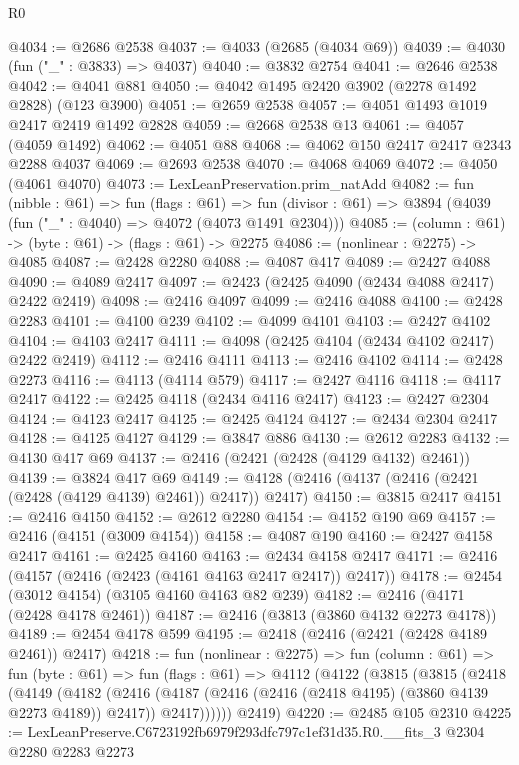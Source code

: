 \begin{lexlean}{R0}
\begin{coremodule}
@4034 := @2686 @2538
@4037 := @4033 (@2685 (@4034 @69))
@4039 := @4030 (fun ("_" : @3833) => @4037)
@4040 := @3832 @2754
@4041 := @2646 @2538
@4042 := @4041 @881
@4050 := @4042 @1495 @2420 @3902 (@2278 @1492 @2828) (@123 @3900)
@4051 := @2659 @2538
@4057 := @4051 @1493 @1019 @2417 @2419 @1492 @2828
@4059 := @2668 @2538 @13
@4061 := @4057 (@4059 @1492)
@4062 := @4051 @88
@4068 := @4062 @150 @2417 @2417 @2343 @2288 @4037
@4069 := @2693 @2538
@4070 := @4068 @4069
@4072 := @4050 (@4061 @4070)
@4073 := LexLeanPreservation.prim_natAdd
@4082 := fun (nibble : @61) =>
  fun (flags : @61) =>
  fun (divisor : @61) => @3894 (@4039 (fun ("_" : @4040) => @4072 (@4073 @1491 @2304)))
@4085 := (column : @61) -> (byte : @61) -> (flags : @61) -> @2275
@4086 := (nonlinear : @2275) -> @4085
@4087 := @2428 @2280
@4088 := @4087 @417
@4089 := @2427 @4088
@4090 := @4089 @2417
@4097 := @2423 (@2425 @4090 (@2434 @4088 @2417) @2422 @2419)
@4098 := @2416 @4097
@4099 := @2416 @4088
@4100 := @2428 @2283
@4101 := @4100 @239
@4102 := @4099 @4101
@4103 := @2427 @4102
@4104 := @4103 @2417
@4111 := @4098 (@2425 @4104 (@2434 @4102 @2417) @2422 @2419)
@4112 := @2416 @4111
@4113 := @2416 @4102
@4114 := @2428 @2273
@4116 := @4113 (@4114 @579)
@4117 := @2427 @4116
@4118 := @4117 @2417
@4122 := @2425 @4118 (@2434 @4116 @2417)
@4123 := @2427 @2304
@4124 := @4123 @2417
@4125 := @2425 @4124
@4127 := @2434 @2304 @2417
@4128 := @4125 @4127
@4129 := @3847 @886
@4130 := @2612 @2283
@4132 := @4130 @417 @69
@4137 := @2416 (@2421 (@2428 (@4129 @4132) @2461))
@4139 := @3824 @417 @69
@4149 := @4128 (@2416 (@4137 (@2416 (@2421 (@2428 (@4129 @4139) @2461)) @2417)) @2417)
@4150 := @3815 @2417
@4151 := @2416 @4150
@4152 := @2612 @2280
@4154 := @4152 @190 @69
@4157 := @2416 (@4151 (@3009 @4154))
@4158 := @4087 @190
@4160 := @2427 @4158 @2417
@4161 := @2425 @4160
@4163 := @2434 @4158 @2417
@4171 := @2416 (@4157 (@2416 (@2423 (@4161 @4163 @2417 @2417)) @2417))
@4178 := @2454 (@3012 @4154) (@3105 @4160 @4163 @82 @239)
@4182 := @2416 (@4171 (@2428 @4178 @2461))
@4187 := @2416 (@3813 (@3860 @4132 @2273 @4178))
@4189 := @2454 @4178 @599
@4195 := @2418 (@2416 (@2421 (@2428 @4189 @2461)) @2417)
@4218 := fun (nonlinear : @2275) =>
  fun (column : @61) =>
  fun (byte : @61) =>
  fun (flags : @61) =>
  @4112
    (@4122
      (@3815
        (@3815
          (@2418
            (@4149
              (@4182
                (@2416
                  (@4187 (@2416 (@2416 (@2418 @4195) (@3860 @4139 @2273 @4189)) @2417))
                  @2417))))))
      @2419)
@4220 := @2485 @105 @2310
@4225 := LexLeanPreserve.C6723192fb6979f293dfc797c1ef31d35.R0.__fits_3 @2304 @2280 @2283 @2273

\end{coremodule}
\end{lexlean}
